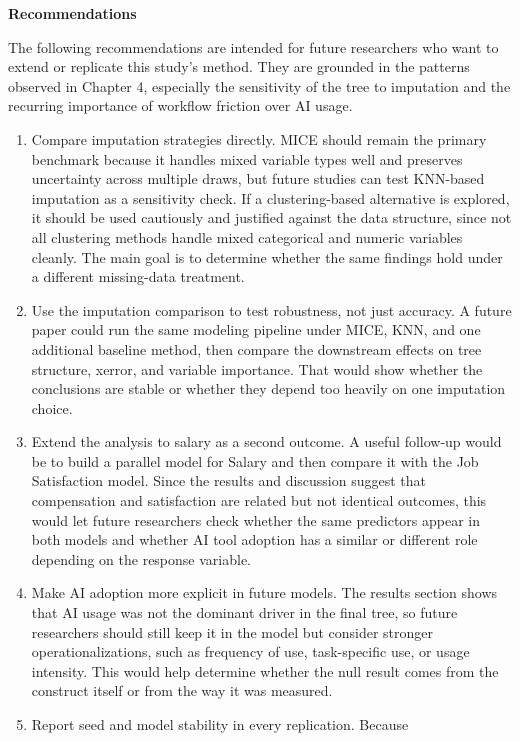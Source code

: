 \documentclass[
]{article}
\begin{document}
\textbf{Recommendations}

The following recommendations are intended for future researchers who
want to extend or replicate this study's method. They are grounded in
the patterns observed in Chapter 4, especially the sensitivity of the
tree to imputation and the recurring importance of workflow friction
over AI usage.

\begin{enumerate}
\def\labelenumi{\arabic{enumi}.}
\item
  Compare imputation strategies directly. MICE should remain the primary
  benchmark because it handles mixed variable types well and preserves
  uncertainty across multiple draws, but future studies can test
  KNN-based imputation as a sensitivity check. If a clustering-based
  alternative is explored, it should be used cautiously and justified
  against the data structure, since not all clustering methods handle
  mixed categorical and numeric variables cleanly. The main goal is to
  determine whether the same findings hold under a different
  missing-data treatment.
\item
  Use the imputation comparison to test robustness, not just accuracy. A
  future paper could run the same modeling pipeline under MICE, KNN, and
  one additional baseline method, then compare the downstream effects on
  tree structure, xerror, and variable importance. That would show
  whether the conclusions are stable or whether they depend too heavily
  on one imputation choice.
\item
  Extend the analysis to salary as a second outcome. A useful follow-up
  would be to build a parallel model for Salary and then compare it with
  the Job Satisfaction model. Since the results and discussion suggest
  that compensation and satisfaction are related but not identical
  outcomes, this would let future researchers check whether the same
  predictors appear in both models and whether AI tool adoption has a
  similar or different role depending on the response variable.
\item
  Make AI adoption more explicit in future models. The results section
  shows that AI usage was not the dominant driver in the final tree, so
  future researchers should still keep it in the model but consider
  stronger operationalizations, such as frequency of use, task-specific
  use, or usage intensity. This would help determine whether the null
  result comes from the construct itself or from the way it was
  measured.
\item
  Report seed and model stability in every replication. Because

\end{enumerate}
\end{document}
